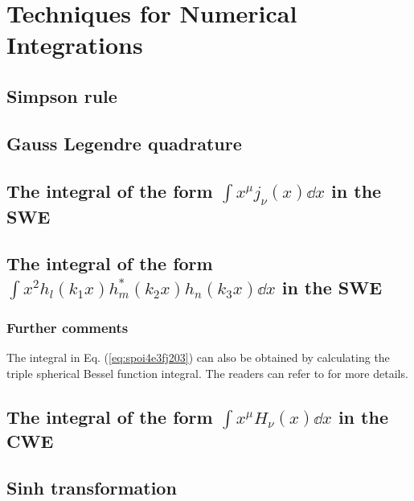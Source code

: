\chapter{Techniques for Numerical Integrations} %

\label{AppendixB} %

\section{Simpson rule}
\label{sec:simpson}

\section{Gauss Legendre quadrature}

\section{The integral of the form $\int x^\mu j_\nu(x) \dd x$ in the SWE}


\section{The integral of the form $\int x^2 h_l(k_1x) h_m^*(k_2x) h_n(k_3x) \dd x$ in the SWE}

\subsection{Further comments}
The integral in Eq. (\ref{eq:spoi4e3fj203}) can also be obtained by calculating the triple spherical Bessel function integral. 
The readers can refer to \cite{AuluckIntegralProductThree} for more details.

\section{The integral of the form $\int x^\mu H_\nu(x) \dd x$ in the CWE}

\section{Sinh transformation}

